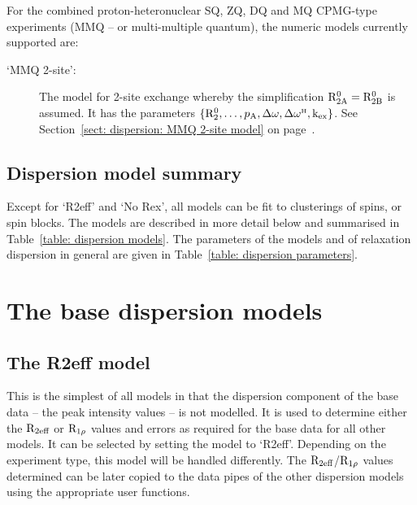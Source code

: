 For the combined proton-heteronuclear SQ, ZQ, DQ and MQ CPMG-type experiments (MMQ -- or multi-multiple quantum), the numeric models currently supported are:

\begin{description}
\item[`MMQ 2-site':]  The model for 2-site exchange whereby the simplification $\mathrm{R}_\mathrm{2A}^0 = \mathrm{R}_\mathrm{2B}^0$ is assumed.  It has the parameters $\{\mathrm{R}_2^0, \dots, p_\textrm{A}, \Delta\omega, \Delta\omega^{\scriptscriptstyle\mathrm{H}}, \textrm{k}_\textrm{ex}\}$.  See Section~\ref{sect: dispersion: MMQ 2-site model} on page~\pageref{sect: dispersion: MMQ 2-site model}.
\end{description}



\subsection{Dispersion model summary}

Except for `R2eff' and `No Rex', all models can be fit to clusterings of spins, or spin blocks.
The models are described in more detail below and summarised in Table~\ref{table: dispersion models}.
The parameters of the models and of relaxation dispersion in general are given in Table~\ref{table: dispersion parameters}.






\section{The base dispersion models}
\label{sect: dispersion: base models}



\subsection{The R2eff model}
\label{sect: dispersion: R2eff model}

This is the simplest of all models in that the dispersion component of the base data -- the peak intensity values -- is not modelled.  It is used to determine either the $\mathrm{R}_\textrm{2eff}$ or $\mathrm{R}_{1\rho}$ values and errors as required for the base data for all other models.  It can be selected by setting the model to `R2eff'.  Depending on the experiment type, this model will be handled differently.  The $\mathrm{R}_\textrm{2eff}$/$\mathrm{R}_{1\rho}$ values determined can be later copied to the data pipes of the other dispersion models using the appropriate user functions.



